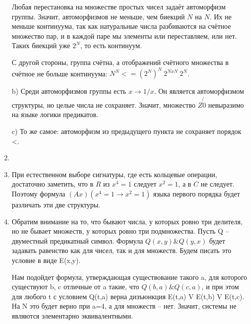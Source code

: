 \documentclass[11pt]{article}
\begin{document}
\begin{enumerate}
		Любая перестановка на множестве простых чисел задаёт автоморфизм группы. Значит, автоморфизмов не меньше, чем биекций $N$ на $N$. Их не меньше континуума, так как натуральные числа разбиваются на счётное множество пар, и в каждой паре мы элементы или переставляем, или нет. Таких биекций уже $2^N$, то есть континуум.
		
		С другой стороны, группа счётна, а отображений счётного множества в счётное не больше континуума: $N^N<=(2^N)^N~2^{NxN}~2^N$.
		
		b) Среди автоморфизмов группы есть $x\to 1/x$. Он является автоморфизмом структуры, но целые числа не сохраняет. Значит, множество $Z \not {0}$ невыразимо на языке логики предикатов.
		
		c) То же самое: автоморфизм из предыдущего пункта не сохраняет порядок <.

		\item  
		\item При естественном выборе сигнатуры, где есть кольцевые операции, достаточно заметить, что в $R$ из $x^4=1$ следует $x^2=1$, а в $C$ не следует. Поэтому формула $(Ax)(x^4=1 \to x^2=1)$ языка первого порядка будет различать эти две структуры.
		\item Обратим внимание на то, что бывают числа, у которых ровно три делителя, но не бывает множеств, у которых ровно три подмножества. Пусть Q -- двуместный предикатный символ. Формула $Q(x,y) \& Q(y,x)$ будет задавать равенство как для чисел, так и для множеств. Будем писать это условие в виде E(x,y).
		
		Нам подойдет формула, утверждающая существование такого a, для которого существуют b, c отличные от a такие, что $Q(b,a) \& Q(c,a)$, и при этом для любого t с условием Q(t,a) верна дизъюнкция E(t,a) V E(t,b) V E(t,c). На N это будет верно при a=4, а для множеств -- нет. Значит, системы не являются элементарно эквивалентными.
		
		
	\end{enumerate}
\end{document}
